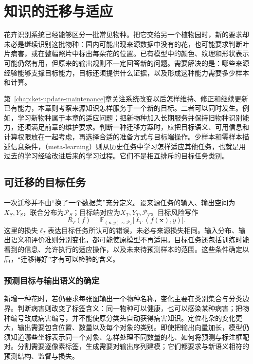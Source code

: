 \chapter{知识的迁移与适应}
\label{chap:ket-transfer-adaptation}

花卉识别系统已经能够区分一批常见物种。把它交给另一个植物园时，新的要求却未必是继续识别这批物种：园内可能出现来源数据中没有的花，也可能要求判断叶片病害，或在整幅照片中标出每朵花的位置。已有模型中的颜色、纹理和形状表示可能仍然有用，但原来的输出规则不一定回答新的问题。需要解决的是：哪些来源经验能够支撑目标能力，目标还须提供什么证据，以及形成这种能力需要多少样本和计算。

第~\ref{chap:ket-update-maintenance}章关注系统改变以后怎样维持、修正和继续更新已有能力，本章则考察来源知识怎样服务于一个新的目标。二者可以同时发生。例如，学习新物种属于本章的适应问题；把新物种加入长期服务并保持旧物种识别能力，还须满足前章的维护要求。判断一种迁移方案时，应把目标语义、可用信息和计算权限放在一起考虑，再选择合适的准备方式与目标端操作。少样本和零样本描述信息条件，（meta-learning）则从历史任务中学习怎样适应其他任务，也就是用过去的学习经验改进后来的学习过程。它们不是相互排斥的目标任务类别。

\section{可迁移的目标任务}
\label{sec:ket-transfer-targets}

一次迁移并不由“换了一个数据集”充分定义。设来源任务的输入、输出空间为$X_S,Y_S$，联合分布为$\mathcal P_S$；目标端对应为$X_T,Y_T,\mathcal P_T$。目标风险写作
\begin{equation}
  R_T(f)=\mathbb E_{(\bm{x},y)\sim\mathcal P_T}
  \bigl[\ell_T(f(\bm{x}),y)\bigr].
  \label{eq:ket-transfer-target-risk}
\end{equation}
这里的损失$\ell_T$表达目标任务所认可的错误，未必与来源损失相同。输入分布、输出语义和评价准则分别变化，都可能使原模型不再适用。目标任务还包括训练时能看到的信息、允许执行的适应操作，以及未来待预测样本的范围。这些条件确定以后，“迁移得好”才有可以检验的含义。

\subsection{预测目标与输出语义的确定}
\label{sec:ket-transfer-output-semantics}

新增一种花时，若仍要求每张图输出一个物种名称，变化主要在类别集合与分类边界。判断病害则改变了标签含义：同一物种可以健康，也可以感染某种病害；把物种编号改成病害编号，并不能使原分类头自动获得病害知识。定位花朵的变化更大，输出需要包含位置、数量以及每个对象的类别。即使把输出向量加长，模型仍须知道哪些坐标表示同一个对象、怎样处理不同数量的花、如何将预测与标注框配对。分割需要逐像素标签，生成需要对输出序列建模；它们都要求与新语义相符的预测结构、监督与损失。

